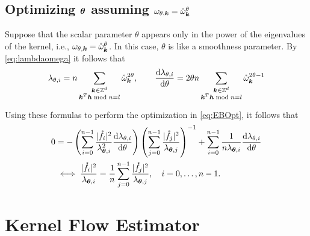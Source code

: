 \documentclass{amsart}
\newcommand{\romega}{\mathring{\omega}}
\begin{document}
\subsection{Optimizing  $\boldsymbol{\theta}$ assuming $\omega_{\theta,\vk} = \romega_{\vk}^{\theta}$}
Suppose that the scalar parameter $\theta$ appears only in the power of the eigenvalues of the kernel, i.e., $\omega_{\theta,\vk} = \romega_{\vk}^{\theta}$.  In this case, $\theta$ is like a smoothness parameter. By \eqref{eq:lambdaomega} it follows that
\begin{equation}
    \lambda_{\theta,i} = n\sum_{\substack{\vk \in \integers^d \\ \vk^T\vh \bmod n = l}} \romega_{\vk}^{2\theta}, \qquad 
    \frac{\dif \lambda_{\theta,i}}{\dif \theta} = 2\theta n\sum_{\substack{\vk \in \integers^d \\ \vk^T\vh \bmod n = l}} \romega_{\vk}^{2\theta-1}
\end{equation}

Using these formulas to perform the optimization in \eqref{eq:EBOpt}, it follows that
\begin{align*} 
   0 & 
   = - \left(\sum_{i=0}^{n-1}\frac{\lvert\mathring{f}_i\rvert^2} 
   {\lambda_{\boldsymbol{\theta},i}^2}  \frac{{\rm d} \lambda_{\theta,i}}{{\rm d} \theta} \right)
   \left( \sum_{j=0}^{n-1} \frac{\lvert\mathring{f}_j\rvert^2}{\lambda_{\boldsymbol{\theta}, j}} \right)^{-1} 
   + \sum_{i=0}^{n-1} \frac 1{n\lambda_{\boldsymbol{\theta},i}} \frac{{\rm d} \lambda_{\theta,i}}{{\rm d} \theta}
    \\
    & \iff
    \frac{\lvert\mathring{f}_i\rvert^2}{\lambda_{\boldsymbol{\theta},i}} = \frac 1n \sum_{j=0}^{n-1} \frac{\lvert\mathring{f}_j\rvert^2}{\lambda_{\boldsymbol{\theta},j}}, \quad i = 0, \ldots, n-1.
\end{align*}

\section{Kernel Flow Estimator} 
\end{document}
